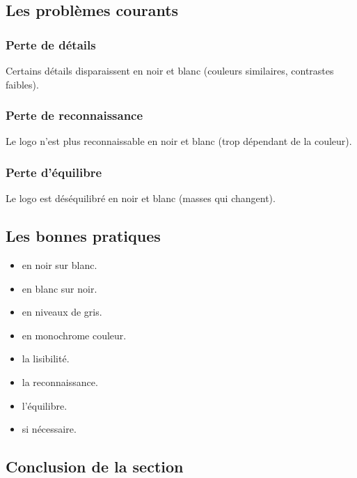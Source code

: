 \subsection{Les problèmes courants}

\subsubsection{Perte de détails}

Certains détails disparaissent en noir et blanc (couleurs similaires, contrastes faibles).

\subsubsection{Perte de reconnaissance}

Le logo n'est plus reconnaissable en noir et blanc (trop dépendant de la couleur).

\subsubsection{Perte d'équilibre}

Le logo est déséquilibré en noir et blanc (masses qui changent).

\subsection{Les bonnes pratiques}

\begin{itemize}
    \item {} en noir sur blanc.
    \item {} en blanc sur noir.
    \item {} en niveaux de gris.
    \item {} en monochrome couleur.
    \item {} la lisibilité.
    \item {} la reconnaissance.
    \item {} l'équilibre.
    \item {} si nécessaire.
\end{itemize}

\subsection*{Conclusion de la section}

